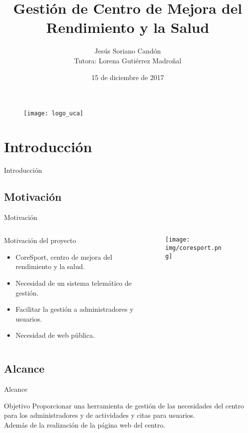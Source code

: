 \documentclass[spanish,xcolor=table,svgnames]{beamer}
\title[Gestión de Centro de Mejora del Rendimiento y la Salud]{Gestión de Centro de Mejora del Rendimiento y la Salud}
\author[Jesús Soriano Candón]{Jesús Soriano Candón\\Tutora: Lorena Gutiérrez Madroñal}
\institute[UCA]{Ingenierí­a Informática}
\date{15 de diciembre de 2017}
\begin{document}
\begin{frame}
  \titlepage
  \begin{figure}
	\texttt{[image: logo\_uca]} 
  \end{figure}
\end{frame}


\section{Introducción}
\begin{frame}{Introducción}
    \tableofcontents[currentsection]
\end{frame}

\subsection*{Motivación}
\begin{frame}{Motivación}
  \begin{columns}[onlytextwidth]
    \begin{column}{0.5\textwidth}
      \begin{block}{Motivación del proyecto}
        \begin{itemize}
          \item CoreSport, centro de mejora del rendimiento y la salud.
          \item Necesidad de un sistema telemático de gestión.
          \item Facilitar la gestión a administradores y usuarios.
          \item Necesidad de web pública.
        \end{itemize}
      \end{block}
    \end{column}
    \begin{column}{0.5\textwidth}
      \centering
      \begin{figure}[H]
        \begin{center}
        \texttt{[image: img/coresport.png]}
        \end{center}
        \label{fig:logo-coresport}
      \end{figure}
    \end{column}
  \end{columns}
\end{frame}


\subsection*{Alcance}
\begin{frame}{Alcance}
\begin{block}{Objetivo}
Proporcionar una herramienta de gestión de las necesidades del centro para los administradores y de actividades y citas para usuarios. \\
Además de la realización de la página web del centro.
\end{block}
\end{frame}
\end{document}
